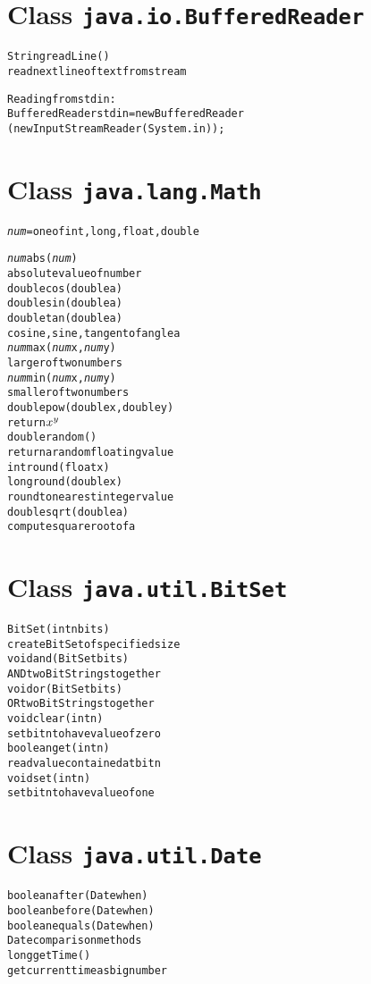 \documentclass[twocolumn,12pt]{article}
\begin{document}
\section*{Class \texttt{java.io.BufferedReader}}
\begin{alltt}
String readLine()
   \textrm{read next line of text from stream}

\textrm{Reading from \texttt{stdin}:}
BufferedReader stdin = new BufferedReader
      (new InputStreamReader(System.in));
\end{alltt}

\section*{Class \texttt{java.lang.Math}}
\begin{alltt}
\emph{num} = \textrm{one of} int, long, float, double

\emph{num} abs(\emph{num})
   \textrm{absolute value of number}
double cos(double a)
double sin(double a)
double tan(double a)
   \textrm{cosine,sine,tangent of angle} a
\emph{num} max(\emph{num} x, \emph{num} y)
   \textrm{larger of two numbers}
\emph{num} min(\emph{num} x, \emph{num} y)
   \textrm{smaller of two numbers}
double pow(double x, double y)
   \textrm{return \(x\sp{y}\)}
double random()
   \textrm{return a random floating value}
int round(float x)
long round(double x)
   \textrm{round to nearest integer value}
double sqrt(double a)
   \textrm{compute square root of} a
\end{alltt}

\section*{Class \texttt{java.util.BitSet}}
\begin{alltt}
BitSet(int nbits)
   \textrm{create} BitSet \textrm{of specified size}
void and(BitSet bits)
   \textrm{AND two} BitStrings \textrm{together}
void or(BitSet bits)
   \textrm{OR two} BitStrings \textrm{together}
void clear(int n)
   \textrm{set bit} n \textrm{to have value of zero}
boolean get(int n)
   \textrm{read value contained at bit} n
void set(int n)
   \textrm{set bit} n \textrm{to have value of one}
\end{alltt}

\section*{Class \texttt{java.util.Date}}
\begin{alltt}
boolean after(Date when)
boolean before(Date when)
boolean equals(Date when)
   Date \textrm{comparison methods}
long getTime()
   \textrm{get current time as big number}
\end{alltt}
\end{document}
